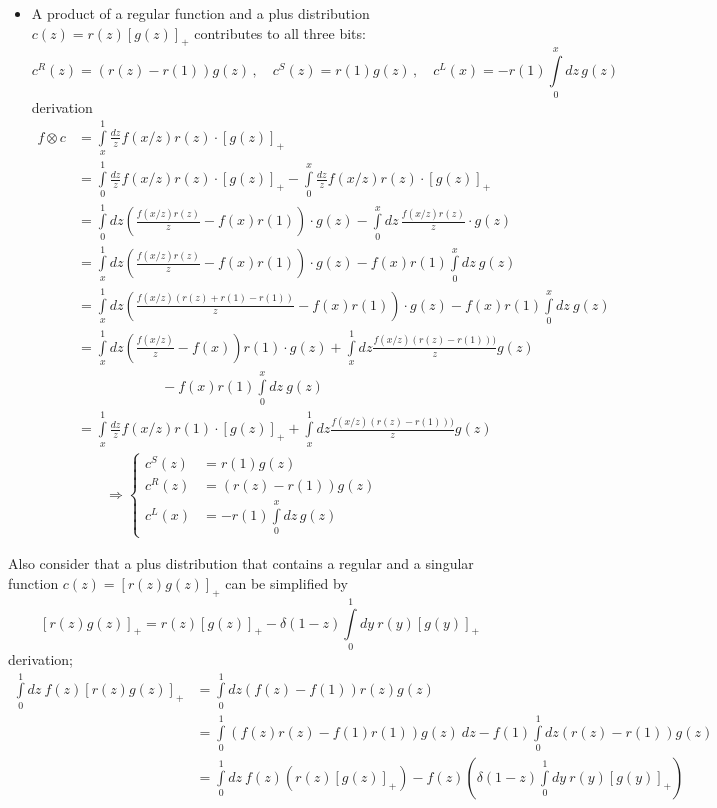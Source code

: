 \begin{itemize}
  \item A product of a regular function and a plus distribution $c(z) = r(z)\left[g(z)\right]_+$
    contributes to all three bits:
    \begin{equation}
      c^R(z) = (r(z)-r(1))g(z)\,,\quad c^S(z) = r(1)g(z)\,,\quad  c^L(x) = -r(1)\int\limits_0^x\!dz\, g(z)
    \end{equation}
    derivation
    \begingroup
    \allowdisplaybreaks
    \begin{align}
        f\otimes c &= \int\limits_x^1 \frac{dz}{z} f(x/z) r(z) \cdot \left[ g(z) \right]_+\\
          &= \int\limits_0^1 \frac{dz}{z} f(x/z) r(z) \cdot \left[ g(z) \right]_+ - \int\limits_0^x \frac{dz}{z} f(x/z) r(z) \cdot \left[ g(z) \right]_+\\
          &= \int\limits_0^1\! dz \left(\frac{f(x/z)r(z)}{z} - f(x)r(1)\right) \cdot g(z) - \int\limits_0^x\!dz\, \frac{ f(x/z) r(z)}{z} \cdot g(z)\\
          &= \int\limits_x^1\! dz \left(\frac{f(x/z)r(z)}{z} - f(x)r(1)\right) \cdot g(z) - f(x) r(1) \int\limits_0^xdz~ g(z)\\
          &= \int\limits_x^1\! dz \left(\frac{f(x/z)(r(z)+r(1)-r(1))}{z} - f(x)r(1)\right) \cdot g(z) - f(x) r(1) \int\limits_0^xdz~ g(z)\\
          &= \int\limits_x^1\! dz \left(\frac{f(x/z)}{z} - f(x)\right) r(1)\cdot g(z) 
          + \int\limits_x^1\! dz \frac{f(x/z)(r(z)-r(1)))}{z} g(z) \nonumber\\
          &\qquad\qquad\qquad- f(x) r(1) \int\limits_0^x\!dz~ g(z)\\
          &= \int\limits_x^1 \frac{dz}{ z} f(x/z)  r(1)\cdot \left[g(z)\right]_+ + \int\limits_x^1\! dz \frac{f(x/z)(r(z)-r(1)))}{z} g(z)\\
          &\qquad\Rightarrow
          \begin{cases}
            c^S(z) &= r(1)g(z)\\
            c^R(z) &= (r(z)-r(1))g(z)\\
            c^L(x) &= -r(1)\int\limits_0^x\!dz\, g(z)
          \end{cases}
    \end{align}
    \endgroup
\end{itemize}

Also consider that a plus distribution that contains a regular and a singular
function $c(z) = \left[r(z)g(z)\right]_+$ can be simplified by
\begin{equation}
  \left[r(z)g(z)\right]_+ = r(z) \left[g(z)\right]_+ - \delta(1-z) \int\limits_0^1 dy~ r(y) \left[g(y)\right]_+
\end{equation}
derivation;
\begin{align}
    \int\limits_0^1 \!dz~ f(z) \left[r(z)g(z)\right]_+ &= \int\limits_0^1 dz \left(f(z) - f(1)\right)r(z)g(z)\\
      &= \int\limits_0^1 \left(f(z)r(z) - f(1)r(1)\right)g(z)~dz - f(1)\int\limits_0^1\! dz(r(z)-r(1))g(z)\\
      &= \int\limits_0^1\! dz~ f(z)\left(r(z) \left[g(z)\right]_+\right) - f(z)\left(\delta(1-z)\int\limits_0^1\! dy~ r(y) \left[g(y)\right]_+\right)
\end{align}
